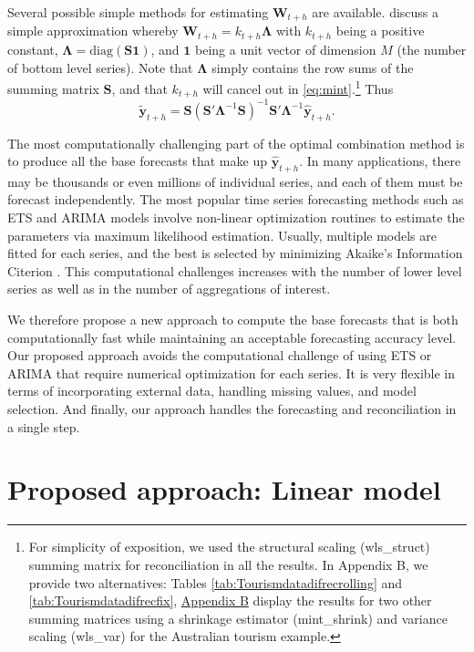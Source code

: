 \documentclass[11pt,a4paper,]{article}
\begin{document}
Several possible simple methods for estimating \(\bm{W}_{t+h}\) are available. \textcite{mint2018} discuss a simple approximation whereby \(\bm{W}_{t+h} = k_{t+h} \bm{\Lambda}\) with \(k_{t+h}\) being a positive constant, \(\bm{\Lambda} = \text{diag}(\bm{S}\bm{1})\), and \(\bm{1}\) being a unit vector of dimension \(M\) (the number of bottom level series). Note that \(\bm{\Lambda}\) simply contains the row sums of the summing matrix \(\bm{S}\), and that \(k_{t+h}\) will cancel out in \eqref{eq:mint}.\footnote{For simplicity of exposition, we used the structural scaling (wls\_struct) summing matrix for reconciliation in all the results. In Appendix B, we provide two alternatives: Tables \ref{tab:Tourismdatadifrecrolling} and \ref{tab:Tourismdatadifrecfix}, \protect\hyperlink{appendixB}{Appendix B} display the results for two other summing matrices using a shrinkage estimator (mint\_shrink) and variance scaling (wls\_var) for the Australian tourism example.} Thus
\begin{equation}\label{eq:mint2}
  \tilde{\bm{y}}_{t+h}=\bm{S}(\bm{S}'\bm{\Lambda}^{-1}\bm{S})^{-1}\bm{S}'\bm{\Lambda}^{-1}\hat{\bm{y}}_{t+h}.
\end{equation}

The most computationally challenging part of the optimal combination method is to produce all the base forecasts that make up \(\hat{\bm{y}}_{t+h}\). In many applications, there may be thousands or even millions of individual series, and each of them must be forecast independently. The most popular time series forecasting methods such as ETS and ARIMA models \autocite{fpp2} involve non-linear optimization routines to estimate the parameters via maximum likelihood estimation. Usually, multiple models are fitted for each series, and the best is selected by minimizing Akaike's Information Citerion \autocite{akaike1998information}. This computational challenges increases with the number of lower level series as well as in the number of aggregations of interest.

We therefore propose a new approach to compute the base forecasts that is both computationally fast while maintaining an acceptable forecasting accuracy level. Our proposed approach avoids the computational challenge of using ETS or ARIMA that require numerical optimization for each series. It is very flexible in terms of incorporating external data, handling missing values, and model selection. And finally, our approach handles the forecasting and reconciliation in a single step.

\hypertarget{proposed-approach-linear-model}{%
\section{\texorpdfstring{Proposed approach: Linear model \label{sec:proposedapproach1}}{Proposed approach: Linear model }}\label{proposed-approach-linear-model}}
\end{document}
